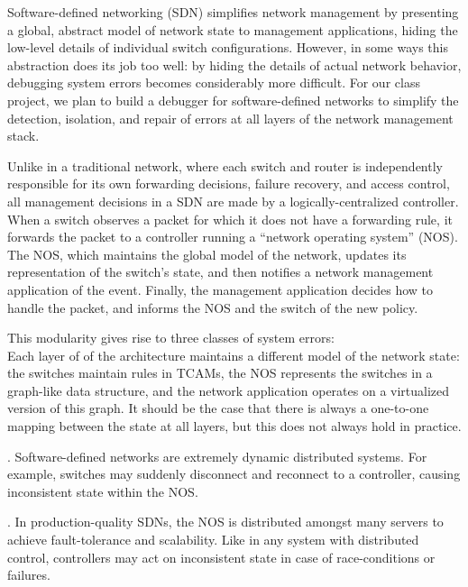 Software-defined networking (SDN) simplifies network management by presenting a
global, abstract model of network state to management applications, hiding
the low-level details of individual switch configurations. However, in some ways this abstraction does
its job too well: by hiding the details of actual network behavior, debugging
system errors becomes considerably more difficult.
For our class project, we plan to build a debugger for software-defined networks to
simplify the detection, isolation, and repair of errors at all layers of
the network management stack.

Unlike in a traditional network, where each switch and router is independently responsible for
its own forwarding decisions, failure recovery, and access control, all management
decisions in a SDN are made by a logically-centralized controller. When a
switch observes a packet for which it does not have a forwarding rule,
it forwards the packet to a controller running a ``network operating system''
(NOS). The NOS, which maintains the global model of the network, updates its representation
of the switch's state, and then notifies a network management application of the event.
Finally, the management application decides how to handle the packet, and informs the NOS
and the switch of the new policy.

This modularity gives rise to three classes of system errors: \\
Each layer of of the architecture maintains a different model of the network state: the
switches maintain rules in TCAMs, the NOS represents the switches
in a graph-like data structure, and the network application operates on 
a virtualized version of this graph. It should be
the case that there is always a one-to-one mapping between the state at all
layers, but this does not always hold in practice.

.
Software-defined networks are extremely dynamic distributed systems.
For example, switches may suddenly disconnect and reconnect to a controller, causing inconsistent state
within the NOS.

. In production-quality SDNs,
the NOS is distributed amongst many servers to achieve fault-tolerance
and scalability. Like in any system with distributed control, controllers may
act on inconsistent state in case of race-conditions or failures.

